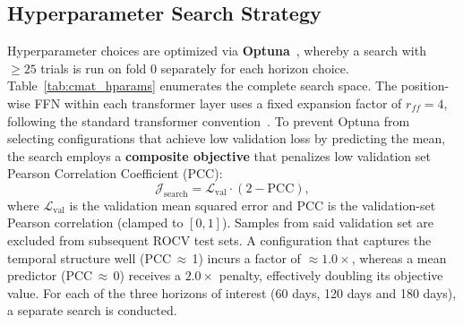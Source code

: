 \subsection{Hyperparameter Search Strategy}
\label{subsec:hyperparameter_search}

Hyperparameter choices are optimized via \textbf{Optuna}~\cite{akiba_optuna_2019}, whereby a search with $ \geq 25$ trials is run on fold 0 separately for each horizon choice. Table~\ref{tab:cmat_hparams} enumerates the complete search space. The position-wise FFN within each transformer layer uses a fixed expansion factor of
$r_{ff} = 4$, following the standard transformer convention~\cite{vaswani_attention_2023}. To prevent Optuna from selecting configurations that achieve low validation loss by predicting the mean, the search employs a \textbf{composite objective} that penalizes low validation set Pearson Correlation Coefficient (PCC):
\begin{equation}
    \mathcal{J}_{\text{search}} = \mathcal{L}_{\text{val}} \cdot (2 - \text{PCC}),
    \label{eq:composite_objective}
\end{equation}
where $\mathcal{L}_{\text{val}}$ is the validation mean squared error and PCC is the validation-set Pearson correlation (clamped to $[0, 1]$). Samples from said validation set are excluded from subsequent ROCV test sets. A configuration that captures the temporal structure well (PCC\,$\approx$\,1) incurs a factor of ${\approx}1.0\times$, whereas a mean predictor (PCC\,$\approx$\,0) receives a $2.0\times$ penalty, effectively doubling its objective value. For each of the three horizons of interest (60 days, 120 days and 180 days), a separate search is conducted.


